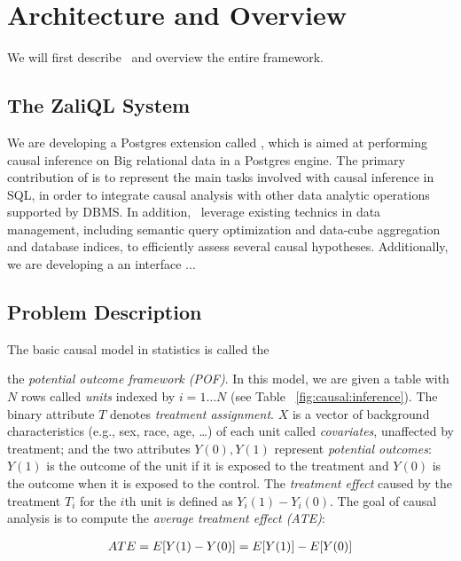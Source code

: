 
\section{Architecture and Overview}
We will first describe \GSQL\ and overview the entire framework.
\subsection{The ZaliQL System}
We are developing a Postgres extension called \GSQL, which is aimed at
performing causal inference
on Big relational data in a Postgres engine. The primary contribution of is to represent the main tasks involved with causal inference in SQL,
in order to integrate causal analysis with other data analytic operations supported by DBMS.
In addition, \GSQL\ leverage existing technics
in data management, including semantic query optimization and data-cube aggregation and database indices, to efficiently assess several causal hypotheses.
Additionally, we are developing a
an interface ... %





\subsection{Problem Description}

The basic causal model in statistics is called the
 the
{\em potential outcome framework (POF)}. In this model, we are given a
table with $N$ rows called {\em units} indexed by $i=1 \ldots N$ (see
Table~ \ref{fig:causal:inference}).  The binary attribute $T$ denotes {\em treatment assignment}.
$X$ is a vector of
background characteristics (e.g., sex, race, age, \ldots) of each unit
called {\em covariates}, unaffected by treatment; and the two
attributes $Y(0), Y(1)$ represent {\em potential outcomes}: $Y(1)$ is
the outcome of the unit if it is exposed to the treatment and $Y(0)$
is the outcome when it is exposed to the control.
The {\em
  treatment effect}
caused by the treatment $T_i$ for the $i$th unit  is defined as $Y_i(1)-Y_i(0)$.
The goal of causal analysis is to compute the {\em average treatment
  effect (ATE)}:


\vspace{-0.5cm}
\begin{align}
  ATE = E[Y(1)-Y(0)] = E[Y(1)] - E[Y(0)] \ignore{=\frac{1}{N} \sum_i (Y_i(1)-Y_i(0))}  \label{eq:ate}
\end{align}
\vspace{-0.5cm}


